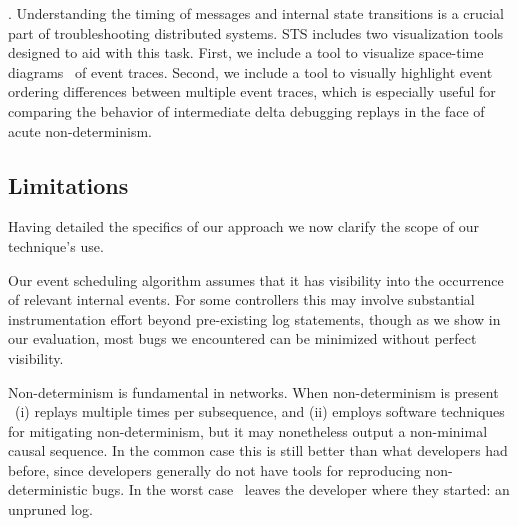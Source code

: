 . Understanding the timing of messages and internal
state transitions is a crucial part of troubleshooting distributed systems.
STS includes two visualization tools designed to aid with this task. First, we
include a tool to visualize space-time diagrams~\cite{Lamport:1978:TCO:359545.359563}
of event traces.
Second, we include a tool to visually highlight event ordering differences
between multiple event traces, which is especially useful for comparing the behavior of
intermediate delta debugging replays in the face of acute non-determinism.


\subsection{Limitations}
\label{subsec:non_goals}

Having detailed the specifics of our approach we now
clarify the scope of our technique's use.

 Our event scheduling algorithm assumes that
it has visibility into the occurrence of relevant internal events. For
some controllers this may involve substantial instrumentation effort beyond
pre-existing log statements, though as we show in our evaluation, most bugs
we encountered can be minimized without perfect visibility.

 Non-determinism
is fundamental in networks. When non-determinism is present
\projectname~(i) replays multiple times per subsequence, and (ii) employs
software techniques for mitigating non-determinism, but it may nonetheless
output a non-minimal causal sequence. In the common case this is still
better than what developers had before, since developers generally
do not have tools for reproducing non-deterministic bugs.
In the worst case \projectname~leaves the
developer where they started: an unpruned log.

